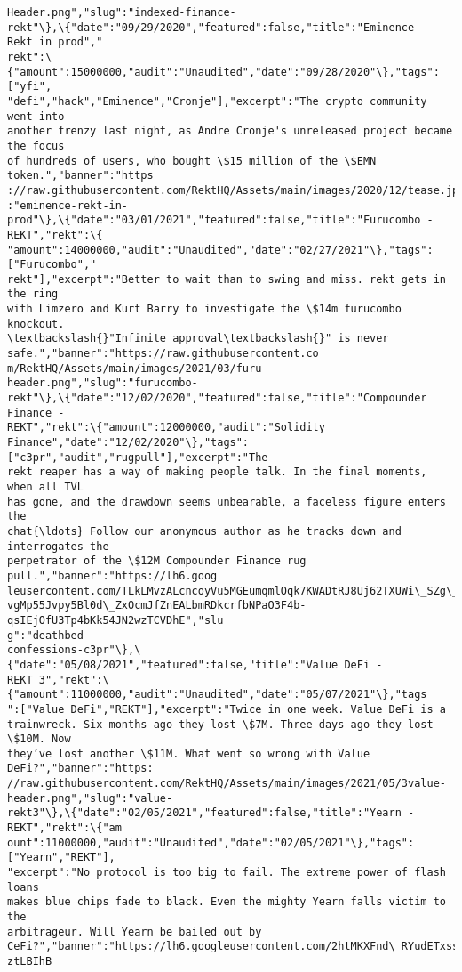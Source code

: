 \documentclass[11pt]{article}
\begin{document}
\begin{Verbatim}[commandchars=\\\{\}]
Header.png","slug":"indexed-finance-
rekt"\},\{"date":"09/29/2020","featured":false,"title":"Eminence - Rekt in prod","
rekt":\{"amount":15000000,"audit":"Unaudited","date":"09/28/2020"\},"tags":["yfi",
"defi","hack","Eminence","Cronje"],"excerpt":"The crypto community went into
another frenzy last night, as Andre Cronje's unreleased project became the focus
of hundreds of users, who bought \$15 million of the \$EMN token.","banner":"https
://raw.githubusercontent.com/RektHQ/Assets/main/images/2020/12/tease.jpg","slug"
:"eminence-rekt-in-
prod"\},\{"date":"03/01/2021","featured":false,"title":"Furucombo - REKT","rekt":\{
"amount":14000000,"audit":"Unaudited","date":"02/27/2021"\},"tags":["Furucombo","
rekt"],"excerpt":"Better to wait than to swing and miss. rekt gets in the ring
with Limzero and Kurt Barry to investigate the \$14m furucombo knockout.
\textbackslash{}"Infinite approval\textbackslash{}" is never safe.","banner":"https://raw.githubusercontent.co
m/RektHQ/Assets/main/images/2021/03/furu-header.png","slug":"furucombo-
rekt"\},\{"date":"12/02/2020","featured":false,"title":"Compounder Finance -
REKT","rekt":\{"amount":12000000,"audit":"Solidity
Finance","date":"12/02/2020"\},"tags":["c3pr","audit","rugpull"],"excerpt":"The
rekt reaper has a way of making people talk. In the final moments, when all TVL
has gone, and the drawdown seems unbearable, a faceless figure enters the
chat{\ldots} Follow our anonymous author as he tracks down and interrogates the
perpetrator of the \$12M Compounder Finance rug pull.","banner":"https://lh6.goog
leusercontent.com/TLkLMvzALcncoyVu5MGEumqmlOqk7KWADtRJ8Uj62TXUWi\_SZg\_gw9iiF9hVi\_
vgMp55Jvpy5Bl0d\_ZxOcmJfZnEALbmRDkcrfbNPaO3F4b-qsIEjOfU3Tp4bKk54JN2wzTCVDhE","slu
g":"deathbed-
confessions-c3pr"\},\{"date":"05/08/2021","featured":false,"title":"Value DeFi -
REKT 3","rekt":\{"amount":11000000,"audit":"Unaudited","date":"05/07/2021"\},"tags
":["Value DeFi","REKT"],"excerpt":"Twice in one week. Value DeFi is a
trainwreck. Six months ago they lost \$7M. Three days ago they lost \$10M. Now
they’ve lost another \$11M. What went so wrong with Value DeFi?","banner":"https:
//raw.githubusercontent.com/RektHQ/Assets/main/images/2021/05/3value-
header.png","slug":"value-
rekt3"\},\{"date":"02/05/2021","featured":false,"title":"Yearn - REKT","rekt":\{"am
ount":11000000,"audit":"Unaudited","date":"02/05/2021"\},"tags":["Yearn","REKT"],
"excerpt":"No protocol is too big to fail. The extreme power of flash loans
makes blue chips fade to black. Even the mighty Yearn falls victim to the
arbitrageur. Will Yearn be bailed out by
CeFi?","banner":"https://lh6.googleusercontent.com/2htMKXFnd\_RYudETxssIO-ztLBIhB

\end{Verbatim}
\end{document}
